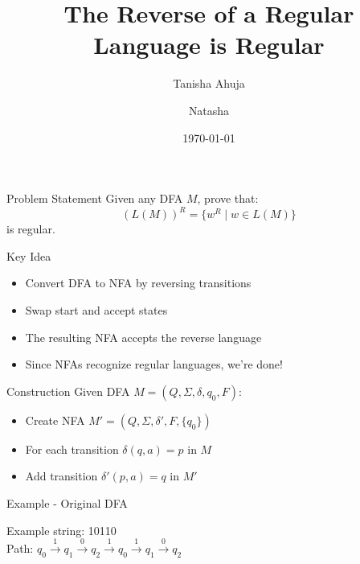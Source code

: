 \documentclass{beamer}
\title{The Reverse of a Regular Language is Regular}
\author{Tanisha Ahuja \and Natasha}
\institute{COMP 382}
\date{\today}
\begin{document}
\begin{frame}
\titlepage
\end{frame}

\begin{frame}{Problem Statement}
Given any DFA $M$, prove that:
\[ (L(M))^R = \{ w^R \mid w \in L(M) \} \]
is regular.
\end{frame}

\begin{frame}{Key Idea}
\begin{itemize}
    \item Convert DFA to NFA by reversing transitions
    \item Swap start and accept states
    \item The resulting NFA accepts the reverse language
    \item Since NFAs recognize regular languages, we're done!
\end{itemize}
\end{frame}

\begin{frame}{Construction}
Given DFA $M = (Q, \Sigma, \delta, q_0, F)$:
\begin{itemize}
    \item Create NFA $M' = (Q, \Sigma, \delta', F, \{q_0\})$
    \item For each transition $\delta(q,a) = p$ in $M$
    \item Add transition $\delta'(p,a) = q$ in $M'$
\end{itemize}
\end{frame}

\begin{frame}{Example - Original DFA}
\begin{center}
\end{center}
Example string: 10110 \\
Path: $q_0 \xrightarrow{1} q_1 \xrightarrow{0} q_2 \xrightarrow{1} q_0 \xrightarrow{1} q_1 \xrightarrow{0} q_2$
\end{frame}
\end{document}

